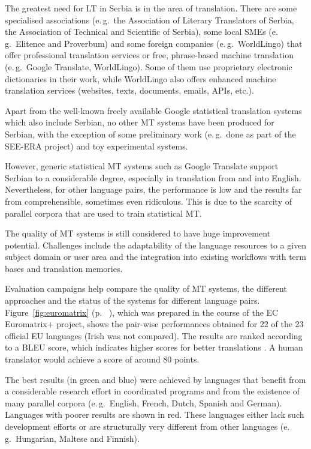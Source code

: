{\begin{multicols}{2}
The greatest need for LT in Serbia is in the area of translation. There are some specialised associations (e.\,g.~the Association of Literary Translators of Serbia, the Association of Technical and Scientific of Serbia), some local SMEs (e.\,g.~Elitence and Proverbum) and some foreign companies (e.\,g.~WorldLingo) that offer professional translation services or free, phrase-based machine translation (e.\,g.~Google Translate, WorldLingo). Some of them use proprietary electronic dictionaries in their work, while WorldLingo also offers enhanced machine translation services (websites, texts, documents, emails, APIs, etc.). 

Apart from the well-known freely available Google statistical translation systems which also include Serbian, no other MT systems have been produced for Serbian, with the exception of some preliminary work (e.\,g.~done as part of the SEE-ERA project) and toy experimental systems. 

However, generic statistical MT systems such as Google Translate support Serbian to a considerable degree, especially in translation from and into English. Nevertheless, for other language pairs, the performance is low and the results far from comprehensible, sometimes even ridiculous. This is due to the scarcity of parallel corpora that are used to train statistical MT.

The quality of MT systems is still considered to have huge improvement potential. Challenges include the adaptability of the language resources to a given subject domain or user area and the integration into existing workflows with term bases and translation memories. 

Evaluation campaigns help compare the quality of MT systems, the different approaches and the status of the systems for different language pairs. Figure~\ref{fig:euromatrix} (p. ~\pageref{fig:euromatrix}), which was prepared in the course of the EC Euromatrix+ project, shows the pair-wise performances obtained for 22 of the 23 official EU languages (Irish was not compared). The results are ranked according to a BLEU score, which indicates higher scores for better translations \cite{bleu1}. A human translator would achieve a score of around 80 points.

The best results (in green and blue) were achieved by languages that benefit from a considerable research effort in coordinated programs and from the existence of many parallel corpora (e.\,g.~English, French, Dutch, Spanish and German). Languages with poorer results are shown in red. These languages either lack such development efforts or are structurally very different from other languages (e.\,g.~Hungarian, Maltese and Finnish).



\end{multicols}}
